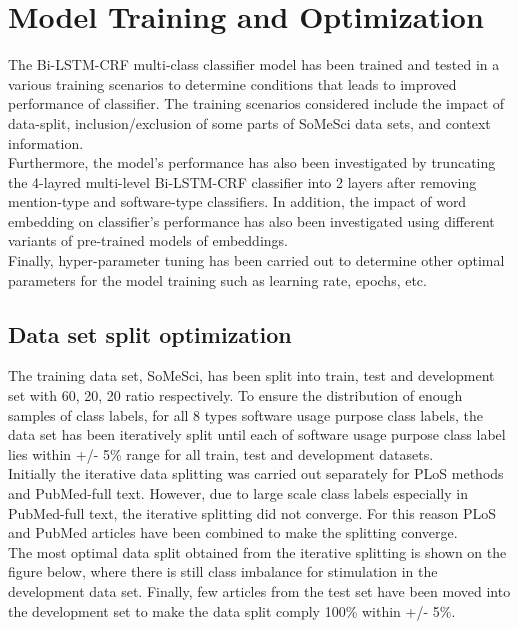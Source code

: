 \chapter{Model Training and Optimization}
\label{ch:chapter06}
 
%
%

The \ac{Bi-LSTM-CRF} multi-class classifier model has been trained and tested in a various training scenarios to determine conditions that leads to improved performance of classifier. 
The training scenarios considered include the impact of data-split, inclusion/exclusion of some parts of SoMeSci data sets, and context information. \\ 

Furthermore, the model’s performance has also been investigated by truncating the 4-layred multi-level Bi-LSTM-CRF classifier into 2 layers after removing mention-type and software-type classifiers. 
In addition, the impact of word embedding on classifier’s performance  has also been investigated using different variants of pre-trained models of embeddings. \\

Finally, hyper-parameter tuning has been carried out to determine other optimal parameters for the model training such as  learning rate, epochs, etc.

\section{Data set split optimization}
\label{sec:chapter06:split}

The training data set, \ac{SoMeSci}, has been split into train, test and development set with  60, 20, 20 ratio respectively. To ensure the distribution  of enough samples of class labels, for all 8 types software usage purpose class labels, the data set has been iteratively split until each of software usage purpose class label lies within +/- 5\%  range for all train, test and development datasets. \\
 
Initially the iterative data splitting was carried out separately for PLoS methods and PubMed-full text. However, due to large scale class labels especially in PubMed-full text, the iterative splitting did not converge. For this reason PLoS and PubMed articles have been combined to make the splitting converge. \\

The most optimal data split obtained from the iterative splitting is shown on the figure below, where there is still class imbalance for stimulation in the development data set. Finally, few articles from the test set have been moved into the development set to make the data split comply 100\% within +/- 5\%. \\


